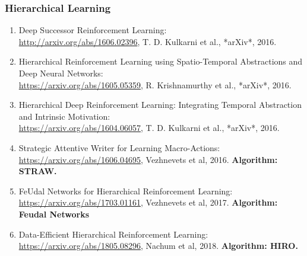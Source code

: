 \documentclass[lang=cn,11pt,a4paper]{eleganttemplate}
\begin{document}
\subsubsection{Hierarchical Learning}
\begin{enumerate}
    \item Deep Successor Reinforcement Learning:\\ \href{http://arxiv.org/abs/1606.02396}{http://arxiv.org/abs/1606.02396}, T. D. Kulkarni et al., *arXiv*, 2016.
    \item Hierarchical Reinforcement Learning using Spatio-Temporal Abstractions and Deep Neural Networks:\\ \href{https://arxiv.org/abs/1605.05359}{https://arxiv.org/abs/1605.05359}, R. Krishnamurthy et al., *arXiv*, 2016.
    \item Hierarchical Deep Reinforcement Learning: Integrating Temporal Abstraction and Intrinsic Motivation:\\ \href{https://arxiv.org/abs/1604.06057}{https://arxiv.org/abs/1604.06057}, T. D. Kulkarni et al., *arXiv*, 2016.
    \item Strategic Attentive Writer for Learning Macro-Actions:\\ \href{https://arxiv.org/abs/1606.04695}{https://arxiv.org/abs/1606.04695}, Vezhnevets et al, 2016. \textbf{Algorithm: STRAW.}
    \item FeUdal Networks for Hierarchical Reinforcement Learning:\\ \href{https://arxiv.org/abs/1703.01161}{https://arxiv.org/abs/1703.01161}, Vezhnevets et al, 2017. \textbf{Algorithm: Feudal Networks}
    \item Data-Efficient Hierarchical Reinforcement Learning:\\ \href{https://arxiv.org/abs/1805.08296}{https://arxiv.org/abs/1805.08296}, Nachum et al, 2018. \textbf{Algorithm: HIRO.}
\end{enumerate}
\end{document}
